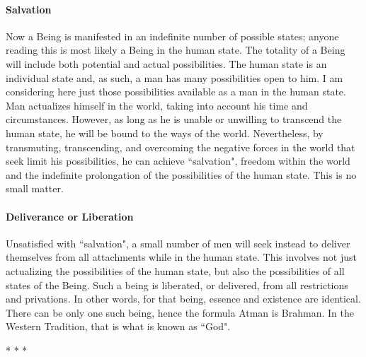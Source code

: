 \paragraph{Salvation}
Now a Being is manifested in an indefinite number of possible states; anyone reading this is most likely a Being in the human state. The totality of a Being will include both potential and actual possibilities. The human state is an individual state and, as such, a man has many possibilities open to him. I am considering here just those possibilities available as a man in the human state. Man actualizes himself in the world, taking into account his time and circumstances. However, as long as he is unable or unwilling to transcend the human state, he will be bound to the ways of the world. Nevertheless, by transmuting, transcending, and overcoming the negative forces in the world that seek limit his possibilities, he can achieve ``salvation", freedom within the world and the indefinite prolongation of the possibilities of the human state. This is no small matter.

\paragraph{Deliverance or Liberation}
Unsatisfied with ``salvation", a small number of men will seek instead to deliver themselves from all attachments while in the human state. This involves not just actualizing the possibilities of the human state, but also the possibilities of all states of the Being. Such a being is liberated, or delivered, from all restrictions and privations. In other words, for that being, essence and existence are identical. There can be only one such being, hence the formula Atman is Brahman. In the Western Tradition, that is what is known as ``God".




\begin{center}* * *\end{center}

